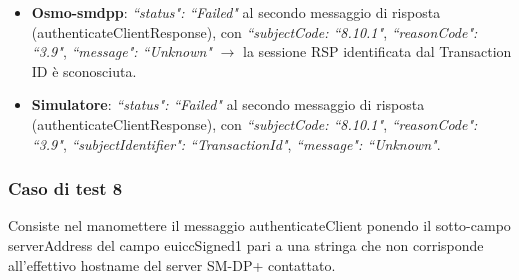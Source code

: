 \documentclass[10pt, oneside]{book}
\begin{document}
\begin{itemize}
\item \textbf{Osmo-smdpp}: \textit{``status": ``Failed"} al secondo messaggio di risposta (authenticateClientResponse), con \textit{``subjectCode: ``8.10.1"}, \textit{``reasonCode": ``3.9"}, \textit{``message": ``Unknown"} $\rightarrow$ la sessione RSP identificata dal Transaction ID è sconosciuta.
\item \textbf{Simulatore}: \textit{``status": ``Failed"} al secondo messaggio di risposta (authenticateClientResponse), con \textit{``subjectCode: ``8.10.1"}, \textit{``reasonCode": ``3.9"}, \textit{``subjectIdentifier": ``TransactionId"}, \textit{``message": ``Unknown"}.
\end{itemize}

\subsubsection{Caso di test 8}
Consiste nel manomettere il messaggio authenticateClient ponendo il sotto-campo serverAddress del campo euiccSigned1 pari a una stringa che non corrisponde all'effettivo hostname del server SM-DP+ contattato.
\end{document}
